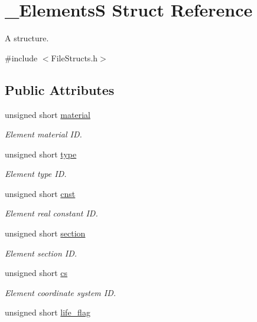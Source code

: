 \hypertarget{struct___elements_s}{}\section{\+\_\+\+ElementsS Struct Reference}
\label{struct___elements_s}


A structure.  




{\ttfamily \#include $<$File\+Structs.\+h$>$}

\subsection*{Public Attributes}
\begin{DoxyCompactItemize}
\item 
unsigned short \hyperlink{struct___elements_s_ac64ee48e51f13b1e7aabb9b6a48cb726}{material}
\begin{DoxyCompactList}\small\item\em Element material ID. \end{DoxyCompactList}\item 
unsigned short \hyperlink{struct___elements_s_ac4a61d8b7016a4a60a6e9f9b90904a93}{type}
\begin{DoxyCompactList}\small\item\em Element type ID. \end{DoxyCompactList}\item 
unsigned short \hyperlink{struct___elements_s_ad11820e13b8992fd7465e5a3c4201e84}{cnst}
\begin{DoxyCompactList}\small\item\em Element real constant ID. \end{DoxyCompactList}\item 
unsigned short \hyperlink{struct___elements_s_a76160d7f046c6435586e878eb1ec93b4}{section}
\begin{DoxyCompactList}\small\item\em Element section ID. \end{DoxyCompactList}\item 
unsigned short \hyperlink{struct___elements_s_a59e50bef826fc636e452a480e42bb082}{cs}
\begin{DoxyCompactList}\small\item\em Element coordinate system ID. \end{DoxyCompactList}\item 
unsigned short \hyperlink{struct___elements_s_a966797bc046fea5472386a7a67867376}{life\+\_\+flag}

\end{DoxyCompactItemize}

